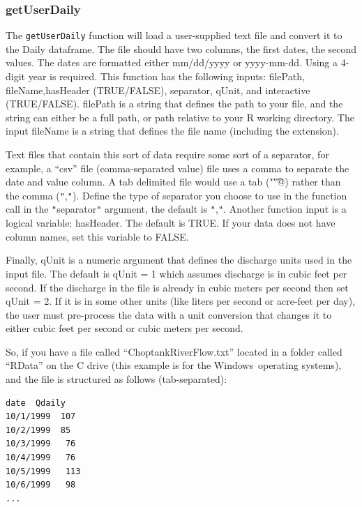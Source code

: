 \documentclass[a4paper,11pt]{article}\usepackage[]{graphicx}\usepackage[]{color}
\begin{document}
\subsubsection{getUserDaily}
\label{sec:DailyFile}
The \texttt{getUserDaily} function will load a user-supplied text file and convert it to the Daily dataframe. The file should have two columns, the first dates, the second values.  The dates are formatted either mm/dd/yyyy or yyyy-mm-dd. Using a 4-digit year is required. This function has the following inputs: filePath, fileName,hasHeader (TRUE/FALSE), separator, qUnit, and interactive (TRUE/FALSE). filePath is a string that defines the path to your file, and the string can either be a full path, or path relative to your R working directory. The input fileName is a string that defines the file name (including the extension).

Text files that contain this sort of data require some sort of a separator, for example, a \enquote{csv} file (comma-separated value) file uses a comma to separate the date and value column. A tab delimited file would use a tab (\verb@"\t"@) rather than the comma (\texttt{"},\texttt{"}). Define the type of separator you choose to use in the function call in the \texttt{"}separator\texttt{"} argument, the default is \texttt{"},\texttt{"}. Another function input is a logical variable: hasHeader.  The default is TRUE. If your data does not have column names, set this variable to FALSE.

Finally, qUnit is a numeric argument that defines the discharge units used in the input file.  The default is qUnit = 1 which assumes discharge is in cubic feet per second.  If the discharge in the file is already in cubic meters per second then set qUnit = 2.  If it is in some other units (like liters per second or acre-feet per day), the user must pre-process the data with a unit conversion that changes it to either cubic feet per second or cubic meters per second.

So, if you have a file called \enquote{ChoptankRiverFlow.txt} located in a folder called \enquote{RData} on the C drive (this example is for the Windows\textregistered\ operating systems), and the file is structured as follows (tab-separated):


\begin{verbatim}
date  Qdaily
10/1/1999  107
10/2/1999  85
10/3/1999	76
10/4/1999	76
10/5/1999	113
10/6/1999	98
...
\end{verbatim}
\end{document}
